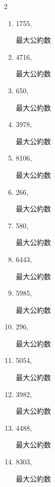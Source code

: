 \begin{multicols}{2}
\begin{enumerate}
  \item 1755,

        最大公約数

  \item 4716,

        最大公約数

  \item 650,

        最大公約数

\columnbreak %

\resetques

  \item 3978,

        最大公約数

  \item 8106,

        最大公約数

  \item 266,

        最大公約数

  \item 580,

        最大公約数

  \item 6443,

        最大公約数

\columnbreak %

  \item 5985,

        最大公約数

  \item 296,

        最大公約数

  \item 5054,

        最大公約数

  \item 3982,

        最大公約数

  \item 4488,

        最大公約数

\columnbreak %

\resetques

  \item 8303,

        最大公約数


\end{enumerate}
\end{multicols}
